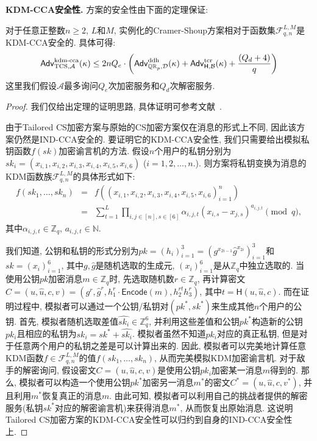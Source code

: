 \begin{trivlist}
\item \textbf{KDM-CCA安全性.} 方案的安全性由下面的定理保证:
\begin{theorem}\label{thm:ch5-TCS}
对于任意正整数$n\geq 2$, $L$和$M$, 实例化的Cramer-Shoup方案相对于函数集$\mathcal{F}_{q,n}^{L,M}$是KDM-CCA安全的. 具体可得:
\begin{displaymath}
\mathsf{Adv}_{\text{TCS}, \mathcal{A}}^{\textup{kdm-cca}}(\kappa) \leq 2nQ_e \cdot \left(\mathsf{Adv}_{\mathbb{QR}_p, \mathcal{D}}^{\textup{ddh}}(\kappa) + \mathsf{Adv}_{\mathsf{H},\mathcal{B}}^{\textup{tcr}}(\kappa) + \frac{(Q_d+4)}{q}\right)
\end{displaymath}
这里我们假设$\mathcal{A}$最多询问$Q_e$次加密服务和$Q_d$次解密服务.
\end{theorem}
\end{trivlist}

\begin{proof}
我们仅给出定理的证明思路, 具体证明可参考文献~\cite{Qin-ACISP-2013}.

由于Tailored CS加密方案与原始的CS加密方案仅在消息的形式上不同, 因此该方案仍然是IND-CCA安全的. 要证明它的KDM-CCA安全性, 我们只需要给出模拟私钥函数$f(sk)$加密谕言机的方法. 假设$n$个用户的私钥分别为$sk_i = (x_{i,1}, x_{i,2}, x_{i,3}, x_{i,4}, x_{i,5}, x_{i,6})$ ($i = 1, 2,\ldots, n.$). 则方案将私钥变换为消息的KDM函数族$\mathcal{F}_{q, n}^{L, M}$的具体形式如下:
\begin{eqnarray*}
f(sk_1, \ldots, sk_n) &=& f((x_{i,1}, x_{i,2}, x_{i,3}, x_{i,4}, x_{i,5}, x_{i,6})_{i = 1}^{n})\\
                      &=& \sum_{t=1}^{L} \prod_{i, j \in [n], s \in [6]} \alpha_{i,j,t}(x_{i,s} - x_{j,s})^{a_{i,j,t}}\pmod q,
\end{eqnarray*}
其中$\alpha_{i,j,t} \in \mathbb{Z}_q$, $a_{i,j,t} \in \mathbb{N}$.

我们知道, 公钥和私钥的形式分别为$pk = (h_i)_{i=1}^3 = \left(g^{x_{2i-1}}\hat{g}^{x_{2i}}\right)_{i = 1}^3$和$sk = (x_i)_{i = 1}^6$, 其中$g, \hat{g}$是随机选取的生成元, $(x_i)_{i = 1}^6$是从$\mathbb{Z}_q$中独立选取的. 当使用公钥$pk$加密消息$m \in \mathbb{Z}_q$时, 先选取随机数$r \in \mathbb{Z}_q$, 再计算密文$C = (u, \hat{u}, c, v) = (g^r, \hat{g}^r, h_1^r \cdot \mathsf{Encode}(m), h_2^{rt}h_3^r)$, 其中$t = \mathsf{H}(u, \hat{u}, c)$. 而在证明过程中, 模拟者可以通过一个公钥/私钥对$(pk^*, sk^*)$来生成其他$n$个用户的公钥. 首先, 模拟者随机选取差值$\widehat{sk_i} \in \mathbb{Z}_q^6$, 并利用这些差值和公钥$pk^*$构造新的公钥$pk_i$且相应的私钥为$sk_i = sk^* + \widehat{sk_i}$. 模拟者虽然不知道$pk_i$对应的真正私钥, 但是对于任意两个用户的私钥之差是可以计算出来的. 因此, 模拟者可以完美地计算任意KDM函数$f \in \mathcal{F}_{q, n}^{L, M}$的值$f(sk_1, \ldots, sk_n)$, 从而完美模拟KDM加密谕言机. 对于敌手的解密询问, 假设密文$C = (u, \hat{u}, c, v)$是使用公钥$pk_i$加密某一消息$m$得到的. 那么, 模拟者可以构造一个使用公钥$pk^*$加密另一消息$m^*$的密文$C^* = (u, \hat{u}, c, v^*)$, 并且利用$m^*$恢复真正的消息$m$. 由此可知, 模拟者可以利用自己的挑战者提供的解密服务(私钥$sk^*$对应的解密谕言机)来获得消息$m^*$, 从而恢复出原始消息. 这说明Tailored CS加密方案的KDM-CCA安全性可以归约到自身的IND-CCA安全性上. 
\end{proof}



